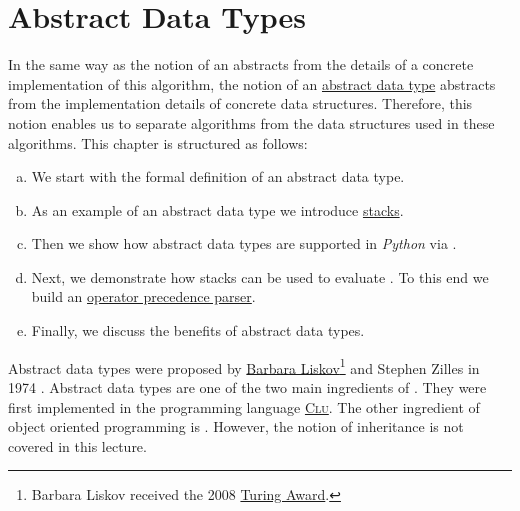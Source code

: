 \chapter{Abstract Data Types}
In the same way as the notion of an  abstracts from the details of a concrete
implementation of this algorithm, the notion of an \href{https://en.wikipedia.org/wiki/Abstract_data_type}{abstract data type} abstracts from the implementation
details of concrete data structures.  Therefore, this notion enables us to separate algorithms from the data
structures used in these algorithms.  This chapter is structured as follows:
\begin{enumerate}[(a)]
\item We start with the formal definition of an abstract data type.  
\item As an example of an abstract data type we introduce
      \href{https://en.wikipedia.org/wiki/Stack_(abstract_data_type)}{stacks}. 
\item Then we show how abstract data types are supported in \textsl{Python} via .  
\item Next, we demonstrate how stacks can be used to evaluate .  To this end we build an
      \href{https://en.wikipedia.org/wiki/Operator-precedence_parser}{operator precedence parser}. 
\item Finally, we discuss the benefits of abstract data types.
\end{enumerate}
Abstract data types were proposed by 
\href{https://en.wikipedia.org/wiki/Barbara_Liskov}{Barbara Liskov}\footnote{
  Barbara Liskov received the 2008 \href{https://en.wikipedia.org/wiki/Turing_Award}{Turing Award}.
} 
and Stephen Zilles in 1974 \cite{liskov:1974}.  Abstract data types are one of the two main ingredients of
.  They were first implemented in the programming language
\href{https://en.wikipedia.org/wiki/CLU_(programming_language)}{\textsc{Clu}}. 
The other ingredient of object oriented programming is .  However, the notion of inheritance
is not covered in this lecture.

